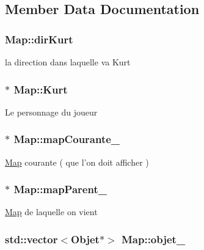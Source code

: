 \subsection{Member Data Documentation}
\hypertarget{classMap_ae3024f314f0e6ba49349d78c43c31c30}{
\subsubsection[{dir\-Kurt}]{ Map\-::dir\-Kurt\hspace{0.3cm}{\ttfamily [protected]}}}\label{classMap_ae3024f314f0e6ba49349d78c43c31c30}
la direction dans laquelle va Kurt \hypertarget{classMap_a44af293f84353a80032d1d9499de1705}{
\subsubsection[{Kurt}]{$\ast$ Map\-::\-Kurt\hspace{0.3cm}{\ttfamily [protected]}}}\label{classMap_a44af293f84353a80032d1d9499de1705}
Le personnage du joueur \hypertarget{classMap_a49f53be912ed1a0ad856bfaede835ca7}{
\subsubsection[{map\-Courante\-\_\-}]{$\ast$ Map\-::map\-Courante\-\_\-\hspace{0.3cm}{\ttfamily [protected]}}}\label{classMap_a49f53be912ed1a0ad856bfaede835ca7}
\hyperlink{classMap}{Map} courante ( que l'on doit afficher ) \hypertarget{classMap_a06607d6259888e4d1ae578b618e95d51}{
\subsubsection[{map\-Parent\-\_\-}]{$\ast$ Map\-::map\-Parent\-\_\-\hspace{0.3cm}{\ttfamily [protected]}}}\label{classMap_a06607d6259888e4d1ae578b618e95d51}
\hyperlink{classMap}{Map} de laquelle on vient \hypertarget{classMap_a2284767a0c9c3917a894d672589e2e20}{
\subsubsection[{objet\-\_\-}]{\setlength{\rightskip}{0pt plus 5cm}std\-::vector$<${\bf Objet}$\ast$$>$ Map\-::objet\-\_\-\hspace{0.3cm}{\ttfamily [protected]}}}\label{classMap_a2284767a0c9c3917a894d672589e2e20}

